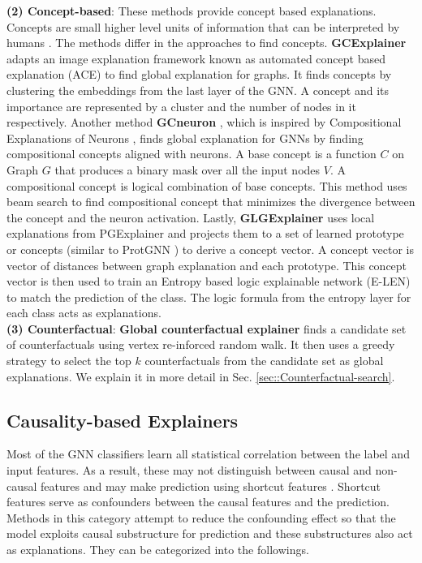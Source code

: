 \textbf{(2) Concept-based}: These methods provide concept based explanations. Concepts are small higher level units of information that can be interpreted by humans \cite{automatic_concept}. The methods differ in the approaches to find concepts. \textbf{GCExplainer} \cite{global_concept_ex} adapts an image explanation framework known as automated concept based explanation (ACE) \cite{automatic_concept} to find global explanation for graphs. It finds concepts by clustering the embeddings from the last layer of the GNN. A concept and its importance are represented by a cluster and the number of nodes in it respectively. Another method \textbf{GCneuron } \cite{Global_neuron}, which is inspired by Compositional Explanations of Neurons \cite{Neuron-compositional}, finds global explanation for GNNs by finding compositional concepts aligned with neurons. A base concept is a function \(C\) on Graph \(G\) that produces a binary mask over all the input nodes \(V\). A compositional concept is logical combination of base concepts. This method uses beam search to find compositional concept that minimizes the divergence between the concept and the neuron activation. Lastly, \textbf{GLGExplainer} \cite{global_logic} uses local explanations from PGExplainer \cite{pgexplainer} and projects them to a set of learned prototype or concepts (similar to ProtGNN \cite{protgnn}) to derive a concept vector. A concept vector is vector of distances between graph explanation and each prototype. This concept vector is then used to train an Entropy based logic explainable network (E-LEN) \cite{logic-LEN} to match the prediction of the class. The logic formula from the entropy layer for each class acts as explanations.\\
\noindent
\textbf{(3) Counterfactual}: \textbf{Global counterfactual explainer} \cite{Global-counter} finds a candidate set of counterfactuals using vertex re-inforced random walk. It then uses a greedy strategy to select the top $k$ counterfactuals from the candidate set as global explanations. We explain it in more detail in Sec. \ref{sec::Counterfactual-search}. %

\subsection{Causality-based Explainers}
Most of the GNN classifiers learn all statistical correlation between the label and input features. As a result, these may not distinguish between causal and non-causal features and may make prediction using shortcut features \cite{causal-attention}. Shortcut features serve as confounders between the causal features and the prediction. Methods in this category attempt to reduce the confounding effect so that the model exploits causal substructure for prediction and these substructures also act as explanations. They can be categorized into the followings.

